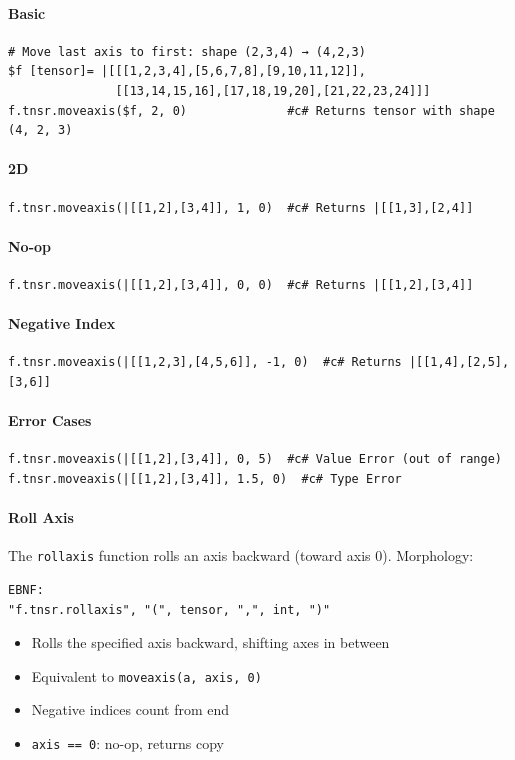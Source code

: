 \paragraph{Basic}
\begin{verbatim}
# Move last axis to first: shape (2,3,4) → (4,2,3)
$f [tensor]= |[[[1,2,3,4],[5,6,7,8],[9,10,11,12]],
               [[13,14,15,16],[17,18,19,20],[21,22,23,24]]]
f.tnsr.moveaxis($f, 2, 0)              #c# Returns tensor with shape (4, 2, 3)
\end{verbatim}

\paragraph{2D}
\begin{verbatim}
f.tnsr.moveaxis(|[[1,2],[3,4]], 1, 0)  #c# Returns |[[1,3],[2,4]]
\end{verbatim}

\paragraph{No-op}
\begin{verbatim}
f.tnsr.moveaxis(|[[1,2],[3,4]], 0, 0)  #c# Returns |[[1,2],[3,4]]
\end{verbatim}

\paragraph{Negative Index}
\begin{verbatim}
f.tnsr.moveaxis(|[[1,2,3],[4,5,6]], -1, 0)  #c# Returns |[[1,4],[2,5],[3,6]]
\end{verbatim}

\paragraph{Error Cases}
\begin{verbatim}
f.tnsr.moveaxis(|[[1,2],[3,4]], 0, 5)  #c# Value Error (out of range)
f.tnsr.moveaxis(|[[1,2],[3,4]], 1.5, 0)  #c# Type Error
\end{verbatim}

\paragraph{Roll Axis}
The \texttt{rollaxis} function rolls an axis backward (toward axis 0).
Morphology:
\begin{verbatim}
EBNF:
"f.tnsr.rollaxis", "(", tensor, ",", int, ")"
\end{verbatim}
\begin{itemize}
\item Rolls the specified axis backward, shifting axes in between
\item Equivalent to \texttt{moveaxis(a, axis, 0)}
\item Negative indices count from end
\item \texttt{axis == 0}: no-op, returns copy
\end{itemize}

